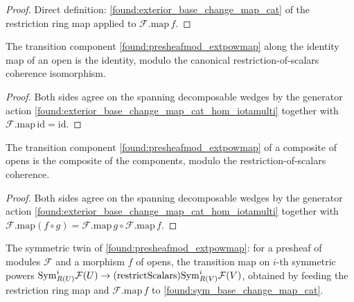 \begin{proof}
  \leanok
  Direct definition: \cref{found:exterior_base_change_map_cat} of the restriction ring
  map applied to \(\mathcal F.\mathrm{map}\,f\).
\end{proof}

\begin{lemma}
  \label{found:presheafmod_extpowmap_id}
  The transition component \cref{found:presheafmod_extpowmap} along the identity map
  of an open is the identity, modulo the canonical restriction-of-scalars coherence
  isomorphism.
\end{lemma}

\begin{proof}
  \leanok
  Both sides agree on the spanning decomposable wedges by the generator action
  \cref{found:exterior_base_change_map_cat_hom_iotamulti} together with
  \(\mathcal F.\mathrm{map}\,\mathrm{id}=\mathrm{id}\).
\end{proof}

\begin{lemma}
  \label{found:presheafmod_extpowmap_comp}
  The transition component \cref{found:presheafmod_extpowmap} of a composite of opens
  is the composite of the components, modulo the restriction-of-scalars coherence.
\end{lemma}

\begin{proof}
  \leanok
  Both sides agree on the spanning decomposable wedges by the generator action
  \cref{found:exterior_base_change_map_cat_hom_iotamulti} together with
  \(\mathcal F.\mathrm{map}(f\circ g)=\mathcal F.\mathrm{map}\,g\circ\mathcal F.\mathrm{map}\,f\).
\end{proof}

\begin{lemma}
  \label{found:presheafmod_sympowmap}
  The symmetric twin of \cref{found:presheafmod_extpowmap}: for a presheaf of modules
  \(\mathcal F\) and a morphism \(f\) of opens, the transition map on \(i\)-th
  symmetric powers
  \(\mathrm{Sym}^i_{R(U)}\mathcal F(U)\to(\mathrm{restrictScalars})\mathrm{Sym}^i_{R(V)}\mathcal F(V)\),
  obtained by feeding the restriction ring map and \(\mathcal F.\mathrm{map}\,f\) to
  \cref{found:sym_base_change_map_cat}.
\end{lemma}

